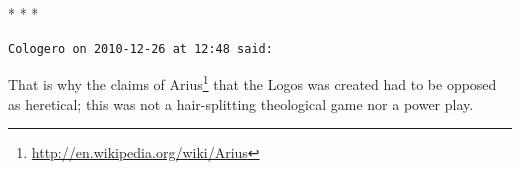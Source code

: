 
\begin{center}* * *\end{center}

\begin{footnotesize}\begin{sffamily}



\texttt{Cologero on 2010-12-26 at 12:48 said: }

That is why the claims of Arius\footnote{\url{http://en.wikipedia.org/wiki/Arius}} that the Logos was created had to be opposed as heretical; this was not a hair-splitting theological game nor a power play.


\end{sffamily}\end{footnotesize}
